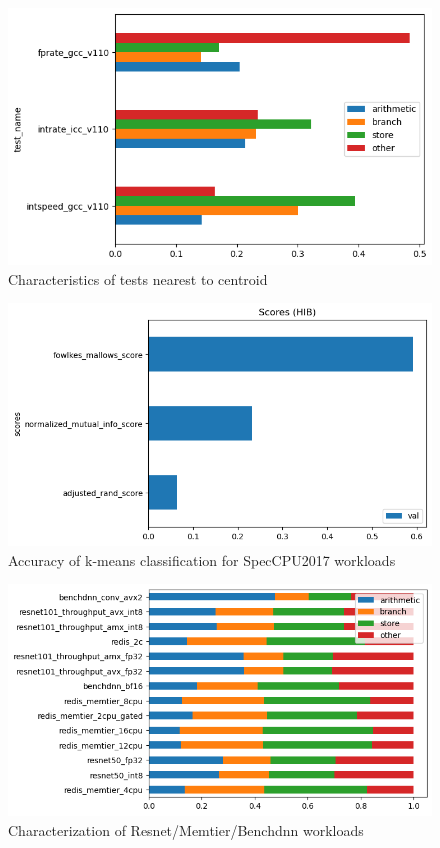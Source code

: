 \documentclass[]{PhDEngScITESO-R}
\begin{document}
\begin{figure}[h]
    \centering
    \includegraphics[width=\textwidth]{Reporte IDI-2 ITESO/img/characterization_cetroid_spec.png}
    \caption{Characteristics of tests nearest to centroid }
    \label{fig:char_small}
\end{figure}

\begin{figure}[h]
    \centering
    \includegraphics[width=\textwidth]{Reporte IDI-2 ITESO/img/results_spec.png}
    \caption{Accuracy of k-means classification for SpecCPU2017 workloads }
    \label{fig:results_spec}
\end{figure}



\begin{figure}[h]
    \centering
    \includegraphics[width=\textwidth]{Reporte IDI-2 ITESO/img/characterization_apps.png}
    \caption{ Characterization of Resnet/Memtier/Benchdnn workloads}
    \label{fig:char_subset_apps}
\end{figure}
\end{document}

